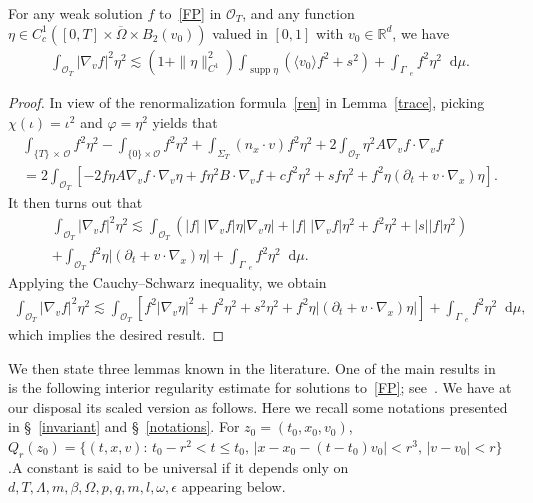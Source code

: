 \documentclass[AHL,Unicode,longabstracts,published]{cedram}
\newcommand*{\dif}{\mathop{}\!\mathrm{d}}
\DeclareMathOperator{\supp}{supp}
\newcommand*\p{\partial}
\newcommand*\R {\mathbb{R}}
\newcommand*\Ge {\Gamma_{\;\!\!\;\!\!e}}
\newcommand*\OO {\mathcal{O}}
\newcommand{\lvv}{\langle v_0\rangle}
\begin{document}
\begin{lemm}\label{energy}
For any weak solution $f$ to~\eqref{FP} in $\OO_T$, and any function $\eta\in C_c^1([0,T]\times\overline{\Omega}\times B_2(v_0))$ valued in $[0,1]$ with $v_0\in\R^d$, we have
\begin{align*}
\int_{\OO_T}\left|\nabla_vf\right|^2\eta^2
\lesssim\left(1+\|\eta\|_{C^1}^2\right)\int_{\supp\eta}\left(\lvv f^2 +s^2\right) +\int_{\Ge} f^2\eta^2 \dif\mu.
\end{align*}
\end{lemm}
\begin{proof}
In view of the renormalization formula~\eqref{ren} in Lemma~\ref{trace}, picking $\chi(\iota)=\iota^2$ and $\varphi=\eta^2$ yields that
\begin{multline*}
\int_{\{T\}\,\times\,\OO}f^2\eta^2-\int_{\{0\}\times\OO}f^2\eta^2 +\int_{\Sigma_T} (n_x\cdot v) f^2\eta^2 +2\int_{\OO_T} \eta^2 A\nabla_vf\cdot\nabla_vf\\
=2\int_{\OO_T}\left[-2f\eta A\nabla_vf\cdot\nabla_v\eta +f\eta^2B\cdot\nabla_vf +cf^2\eta^2 +sf\eta^2 +f^2\eta(\p_t+v\cdot\nabla_x)\eta\right].
\end{multline*}
It then turns out that
\begin{multline*}
\int_{\OO_T} \left|\nabla_vf\right|^2\eta^2
\lesssim
\int_{\OO_T}\left(|f|\;\left|\nabla_vf\right| \eta\left|\nabla_v\eta\right| + |f|\;\left|\nabla_vf\right|\eta^2 +f^2\eta^2 +|s||f|\eta^2\right)\\
+\int_{\OO_T}f^2\eta\left|\left(\p_t+v\cdot\nabla_x\right)\eta\right| +\int_{\Ge}f^2\eta^2\dif\mu.
\end{multline*}
Applying the Cauchy--Schwarz inequality, we obtain
\begin{align*}
\int_{\OO_T} \left|\nabla_vf\right|^2\eta^2
\lesssim
\int_{\OO_T}\left[f^2\left|\nabla_v\eta\right|^2 + f^2\eta^2 + s^2 \eta^2 +f^2\eta\left|\left(\p_t+v\cdot\nabla_x\right)\eta\right|\right] +\int_{\Ge}f^2\eta^2\dif\mu,
\end{align*}
which implies the desired result.
\end{proof}

We then state three lemmas known in the literature. One of the main results in~\cite{GIMV} is the following interior regularity estimate for solutions to~\eqref{FP}; see~\cite[Theorem~1.4]{GIMV}. We have at our disposal its scaled version as follows. Here we recall some notations presented in \S~\ref{invariant} and \S~\ref{notations}. For $z_0=(t_0,x_0,v_0)$, $Q_r(z_{0})=\{ (t,x,v): \, t_{0} - r^{2} < t \le t_{0}, \, |x - x_{0} - (t - t_{0})v_{0}| < r^{3},\, |v - v_{0}| < r\}$.\linebreak A constant is said to be universal if it depends only on $d,T,\Lambda,m,\beta,\Omega,p,q,m,l,\omega,\epsilon$ appearing below.
\end{document}
